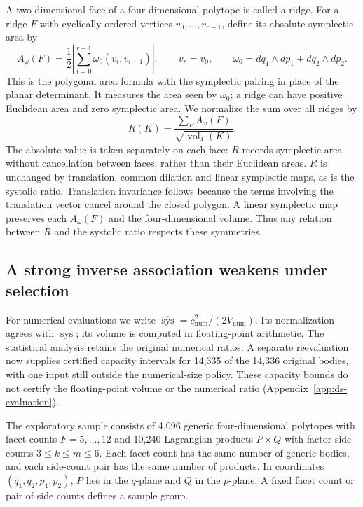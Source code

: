 A two-dimensional face of a four-dimensional polytope is called a ridge.
For a ridge $F$ with cyclically ordered vertices $v_0,\ldots,v_{r-1}$, define
its absolute symplectic area by
\[
 A_\omega(F)=\frac12\left|\sum_{i=0}^{r-1}\omega_0(v_i,v_{i+1})\right|,
 \qquad v_r=v_0,\qquad
 \omega_0=dq_1\wedge dp_1+dq_2\wedge dp_2.
\]
This is the polygonal area formula with the symplectic pairing in place
of the planar determinant. It measures the area seen by $\omega_0$; a
ridge can have positive Euclidean area and zero symplectic area. We
normalize the sum over all ridges by
\[
 R(K)=\frac{\sum_F A_\omega(F)}{\sqrt{\operatorname{vol}_4(K)}}.
\]
The absolute value is taken separately on each face: $R$ records symplectic
area without cancellation between faces, rather than their Euclidean areas.
$R$ is unchanged by translation, common dilation and linear symplectic
maps, as is the systolic ratio.
Translation invariance follows because the terms involving the
translation vector cancel around the closed polygon. A linear symplectic
map preserves each $A_\omega(F)$ and the four-dimensional volume.
Thus any relation between $R$ and the systolic ratio respects these symmetries.

\subsection{A strong inverse association weakens under selection}

For numerical evaluations we write
$\widehat{\operatorname{sys}}=c_{\mathrm{num}}^2/(2V_{\mathrm{num}})$.
Its normalization agrees with $\operatorname{sys}$; its volume is computed
in floating-point arithmetic. The statistical analysis retains the original
numerical ratios. A separate reevaluation now supplies certified capacity
intervals for 14,335 of the 14,336 original bodies, with one input still
outside the numerical-size policy. These capacity bounds do not certify
the floating-point volume or the numerical ratio
(Appendix~\ref{app:ds-evaluation}).

The exploratory sample consists of 4,096 generic four-dimensional polytopes
with facet counts $F=5,\ldots,12$ and 10,240 Lagrangian products $P\times Q$
with factor side counts $3\leq k\leq m\leq6$. Each facet count has the
same number of generic bodies, and each side-count pair has the same
number of products. In coordinates $(q_1,q_2,p_1,p_2)$, $P$ lies in the $q$-plane and
$Q$ in the $p$-plane. A fixed facet count or pair of side counts defines a
sample group.

